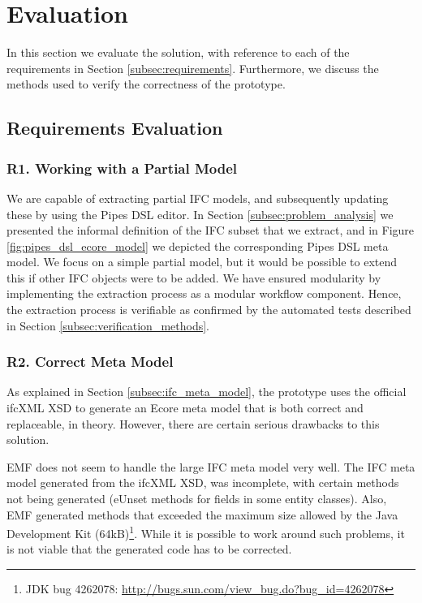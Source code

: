 \section{Evaluation}
\label{sec:evaluation}
In this section we evaluate the solution, with reference to each of the requirements in Section \ref{subsec:requirements}. Furthermore, we discuss the methods used to verify the correctness of the prototype.


\subsection{Requirements Evaluation}
\label{subsec:requirements_evaluation}
\subsubsection{R1. Working with a Partial Model}
We are capable of extracting partial IFC models, and subsequently updating these by using the Pipes DSL editor. In Section \ref{subsec:problem_analysis} we presented the informal definition of the IFC subset that we extract, and in Figure \ref{fig:pipes_dsl_ecore_model} we depicted the corresponding Pipes DSL meta model. We focus on a simple partial model, but it would be possible to extend this if other IFC objects were to be added. We have ensured modularity by implementing the extraction process as a modular workflow component. Hence, the extraction process is verifiable as confirmed by the automated tests described in Section \ref{subsec:verification_methods}.

\subsubsection{R2. Correct Meta Model} As explained in Section \ref{subsec:ifc_meta_model}, the prototype uses the official ifcXML XSD to generate an Ecore meta model that is both correct and replaceable, in theory. However, there are certain serious drawbacks to this solution.

EMF does not seem to handle the large IFC meta model very well. The IFC meta model generated from the ifcXML XSD, was incomplete, with certain methods not being generated (eUnset methods for fields in some entity classes). Also, EMF generated methods that exceeded the maximum size allowed by the Java Development Kit (64kB)\footnote{JDK bug 4262078: \url{http://bugs.sun.com/view_bug.do?bug_id=4262078}}. While it is possible to work around such problems, it is not viable that the generated code has to be corrected.

